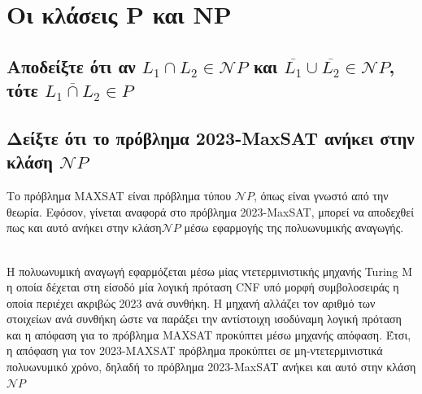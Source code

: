 \section{Οι κλάσεις P και NP}

\subsection{Αποδείξτε ότι αν $L_1 \cap L_2 \in \mathcal{N}P$ και $\overline{L_1} \cup \overline{L_2} \in \mathcal{N}P$, τότε $\overline{L_1 \cap L_2} \in P$}
\subsection{Δείξτε ότι  το πρόβλημα 2023-MaxSAT ανήκει στην κλάση $\mathcal{N}P$}

Το πρόβλημα MAXSAT είναι πρόβλημα τύπου $\mathcal{N}P$, όπως είναι γνωστό από την θεωρία. Εφόσον, γίνεται αναφορά στο πρόβλημα 2023-MaxSAT, μπορεί να αποδεχθεί πως και αυτό ανήκει στην κλάση$\mathcal{N}P$ μέσω εφαρμογής της πολυωνυμικής  αναγωγής.

\noindent\\
Η πολυωνυμική αναγωγή εφαρμόζεται μέσω μίας ντετερμινιστικής μηχανής Turing Μ η οποία δέχεται στη είσοδό μία λογική πρόταση CNF υπό μορφή συμβολοσειράς η οποία περιέχει ακριβώς 2023 ανά συνθήκη.  Η μηχανή αλλάζει τον αριθμό των στοιχείων ανά συνθήκη ώστε να παράξει την αντίστοιχη ισοδύναμη λογική πρόταση και η απόφαση για το πρόβλημα MAXSAT προκύπτει μέσω μηχανής απόφαση. Έτσι, η απόφαση για τον 2023-MAXSAT πρόβλημα προκύπτει  σε μη-ντετερμινιστικά πολυωνυμικό χρόνο, δηλαδή το πρόβλημα 2023-MaxSAT ανήκει και αυτό στην κλάση $\mathcal{N}P$





